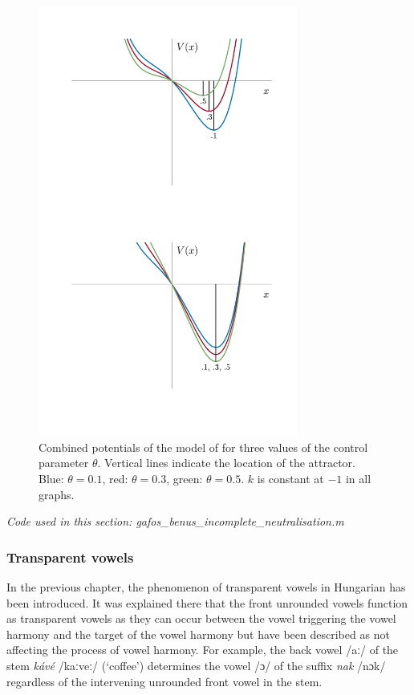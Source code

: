 \begin{figure}[t]
\includegraphics[width=8.5cm]{figures/ch3/gafos_combined_potentials.pdf}
\caption[Combined potentials of the model of \citet{GafosBenus2006}.]{Combined potentials of the model of \citet{GafosBenus2006} for three values of the control parameter $\theta$. Vertical lines indicate the location of the attractor. Blue: $\theta = 0.1$, red: $\theta = 0.3$, green: $\theta = 0.5$. $k$ is constant at $-1$ in all graphs.}
\label{fig:gafos_benus_combined_potentials}
\end{figure}

\medskip\noindent \textit{Code used in this section: gafos\_benus\_incomplete\_neutralisation.m}

\subsubsection{Transparent vowels}

In the previous chapter, the phenomenon of transparent vowels in Hungarian has been introduced. It was explained there that the front unrounded vowels function as transparent vowels as they can occur between the vowel triggering the vowel harmony and the target of the vowel harmony but have been described as not affecting the process of vowel harmony. For example, the back vowel /aː/ of the stem \emph{kávé} /kaːveː/ (`coffee') determines the vowel /ɔ/ of the suffix \emph{nak} /nɔk/ regardless of the intervening unrounded front vowel in the stem. 

